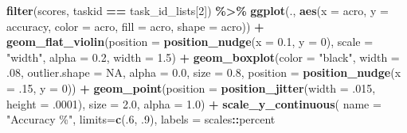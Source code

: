 \documentclass[
]{book}
\newenvironment{Shaded}{\begin{snugshade}}{\end{snugshade}}
\newcommand{\AttributeTok}[1]{\textcolor[rgb]{0.13,0.29,0.53}{#1}}
\newcommand{\ConstantTok}[1]{\textcolor[rgb]{0.56,0.35,0.01}{#1}}
\newcommand{\DecValTok}[1]{\textcolor[rgb]{0.00,0.00,0.81}{#1}}
\newcommand{\FloatTok}[1]{\textcolor[rgb]{0.00,0.00,0.81}{#1}}
\newcommand{\FunctionTok}[1]{\textcolor[rgb]{0.13,0.29,0.53}{\textbf{#1}}}
\newcommand{\NormalTok}[1]{#1}
\newcommand{\SpecialCharTok}[1]{\textcolor[rgb]{0.81,0.36,0.00}{\textbf{#1}}}
\newcommand{\StringTok}[1]{\textcolor[rgb]{0.31,0.60,0.02}{#1}}
\begin{document}
\begin{Shaded}
\begin{Highlighting}[]
\FunctionTok{filter}\NormalTok{(scores, taskid }\SpecialCharTok{==}\NormalTok{ task\_id\_lists[}\DecValTok{2}\NormalTok{]) }\SpecialCharTok{\%\textgreater{}\%}
  \FunctionTok{ggplot}\NormalTok{(., }\FunctionTok{aes}\NormalTok{(}\AttributeTok{x =}\NormalTok{ acro, }\AttributeTok{y =}\NormalTok{ accuracy, }\AttributeTok{color =}\NormalTok{ acro,}
                \AttributeTok{fill =}\NormalTok{ acro, }\AttributeTok{shape =}\NormalTok{ acro)) }\SpecialCharTok{+}
  \FunctionTok{geom\_flat\_violin}\NormalTok{(}\AttributeTok{position =} \FunctionTok{position\_nudge}\NormalTok{(}\AttributeTok{x =} \FloatTok{0.1}\NormalTok{, }\AttributeTok{y =} \DecValTok{0}\NormalTok{),}
                   \AttributeTok{scale =} \StringTok{"width"}\NormalTok{, }\AttributeTok{alpha =} \FloatTok{0.2}\NormalTok{, }\AttributeTok{width =} \FloatTok{1.5}\NormalTok{) }\SpecialCharTok{+}
  \FunctionTok{geom\_boxplot}\NormalTok{(}\AttributeTok{color =} \StringTok{"black"}\NormalTok{, }\AttributeTok{width =}\NormalTok{ .}\DecValTok{08}\NormalTok{, }\AttributeTok{outlier.shape =} \ConstantTok{NA}\NormalTok{, }\AttributeTok{alpha =} \FloatTok{0.0}\NormalTok{,}
               \AttributeTok{size =} \FloatTok{0.8}\NormalTok{, }\AttributeTok{position =} \FunctionTok{position\_nudge}\NormalTok{(}\AttributeTok{x =}\NormalTok{ .}\DecValTok{15}\NormalTok{, }\AttributeTok{y =} \DecValTok{0}\NormalTok{)) }\SpecialCharTok{+}
  \FunctionTok{geom\_point}\NormalTok{(}\AttributeTok{position =} \FunctionTok{position\_jitter}\NormalTok{(}\AttributeTok{width =}\NormalTok{ .}\DecValTok{015}\NormalTok{, }\AttributeTok{height =}\NormalTok{ .}\DecValTok{0001}\NormalTok{),}
             \AttributeTok{size =} \FloatTok{2.0}\NormalTok{, }\AttributeTok{alpha =} \FloatTok{1.0}\NormalTok{) }\SpecialCharTok{+}
  \FunctionTok{scale\_y\_continuous}\NormalTok{(}
    \AttributeTok{name =} \StringTok{"Accuracy \%"}\NormalTok{,}
    \AttributeTok{limits=}\FunctionTok{c}\NormalTok{(.}\DecValTok{6}\NormalTok{, .}\DecValTok{9}\NormalTok{),}
    \AttributeTok{labels =}\NormalTok{ scales}\SpecialCharTok{::}\NormalTok{percent}


\end{Highlighting}
\end{Shaded}
\end{document}

